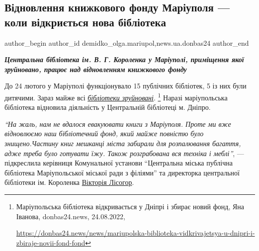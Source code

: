  
 
 
 
 
 
\subsection{Відновлення книжкового фонду Маріуполя — коли відкриється нова бібліотека}
\label{sec:20_10_2022.stz.news.ua.donbas24.1.vidnovlennja_knyzhkovogo_fondu_mrpl_biblioteka}
 
\ifcmt
 author_begin
   author_id demidko_olga.mariupol,news.ua.donbas24
 author_end
\fi


\begin{center}
  \em\bfseries\Large
Центральна бібліотека ім. В. Г. Короленка у Маріуполі, приміщення якої
зруйновано, працює над відновленням книжкового фонду
\end{center}

До 24 лютого у Маріуполі функціонувало 15 публічних бібліотек, 5 із них були
дитячими. Зараз майже всі \href{https://donbas24.news/news/mariupolska-biblioteka-vidkrivajetsya-u-dnipri-i-zbiraje-novii-fond-fond}{\emph{бібліотеки зруйновані}}.%
\footnote{Маріупольська бібліотека відкривається у Дніпрі і збирає новий фонд, Яна Іванова, donbas24.news, 24.08.2022, \par%
\url{https://donbas24.news/news/mariupolska-biblioteka-vidkrivajetsya-u-dnipri-i-zbiraje-novii-fond-fond}%
}
Наразі маріупольська
бібліотека відновила діяльність у Центральній бібліотеці м. Дніпро.

\begin{leftbar}
\emph{\enquote{На жаль, нам не вдалося евакуювати книги з Маріуполя. Проте ми вже
відновлюємо наш бібліотечний фонд, який майже повністю було
знищено.Частину книг мешканці міста забирали для розпалювання багаття,
адже треба було готувати їжу. Також розграбована вся техніка і меблі}},
— підкреслила керівниця Комунальної установи \enquote{Центральна міська
публічна бібліотека Маріупольської міської ради з філіями} та
директорка центральної бібліотеки ім. Короленка \href{https://www.facebook.com/viktoria.lisogor}{Вікторія Лісогор}.
\end{leftbar}


